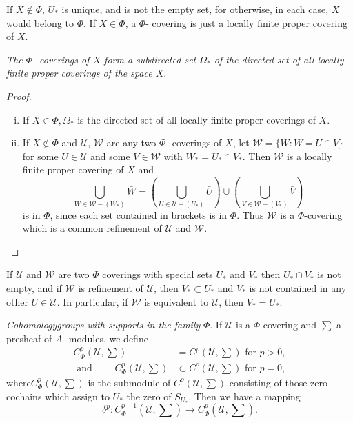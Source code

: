 \begin{remark*}%
If $X \notin \Phi$, $U_*$ is unique, and is not the empty set, for
otherwise, in each case, $X$ would belong to $\Phi$. If $X \in
\Phi$, a $\Phi$- covering is just a locally finite proper covering of
$X$. 
\end{remark*}

\textit{The $\Phi$- coverings of $X$ form a subdirected set
  $\Omega_*$ of the directed set of all locally finite proper
  coverings of the space $X$}. 
\begin{proof}

\begin{enumerate}[(i)]
\item If $X \in \Phi, \Omega_\ast$ is the directed set of all locally 
  finite proper coverings of $X$. 

\item If $X \notin \Phi $ and $\mathscr{U}$, $\mathscr{W}$ are any two 
  $\Phi$- coverings of $X$, let $\mathscr{W} =\bigg\{ W: W= U \cap V
  \bigg\}$ for some $U \in \mathscr{U}$ and some $V \in \mathscr{W}$
  with $W_\ast = U_\ast \cap V_\ast$. Then $\mathscr{W}$ is a locally finite
  proper covering of $X$ and 
$$
\bigcup \limits_{W \in \mathscr{W}-(W_\ast)} \bar{W} =(\bigcup \limits_{U
  \in \mathscr{U}-(U_\ast)} \bar{U}) \cup (\bigcup \limits_{V \in
  \mathscr{W}-(V_\ast)} \bar{V}) 
$$
is in $\Phi$, since each set contained in brackets is in $\Phi$. Thus 
$\mathscr{W}$ is a $\Phi$-covering which is a common refinement of
$\mathscr{U}$ and $\mathscr{W}$. 
\end{enumerate}
\end{proof}

\begin{remark*}%
If $\mathscr{U}$ and $\mathscr{W}$ are two $\Phi$ coverings with
special sets $U_*$ and $V_*$ then $U_* \cap V_*$ is not empty, and if
$\mathscr{W}$ is refinement of $\mathscr{U}$, then $V_* \subset U_*$
and $V_*$ is not contained in any other $U \in \mathscr{U}$. In
particular, if $\mathscr{W}$ is equivalent to $\mathscr{U}$, then
$V_*= U_*$.  
\end{remark*}

\textit{Cohomology\pageoriginale groups with supports in the family} $\Phi$. If
$\mathscr{U}$ is a $\Phi$-covering and $\sum$ a presheaf of $A$-
modules, we define  
\begin{align*}
C^p_{\Phi}\left(\mathscr{U},\sum \right) & = C^p \left(\mathscr{U},
\sum\right) \text{ for } p 
> 0, \\
\text{ and } \qquad 
C^p_{\Phi}\left(\mathscr{U},\sum \right) & \subset C^o \left(\mathscr{U},
\sum \right) \text{ for } p= 0,  
\end{align*}
where$C^p_{\Phi}\left(\mathscr{U},\sum \right)$ is the submodule of
$C^o\left(\mathscr{U},\sum \right)$ consisting of those zero cochains
which assign 
to $U_*$ the zero of $S_{U_*}$. Then we have a mapping  
$$
\delta^p : C^{p-1}_{\Phi}\left(\mathscr{U},\sum \right) \to
C^p_{\Phi}\left(\mathscr{U},\sum \right). 
$$


